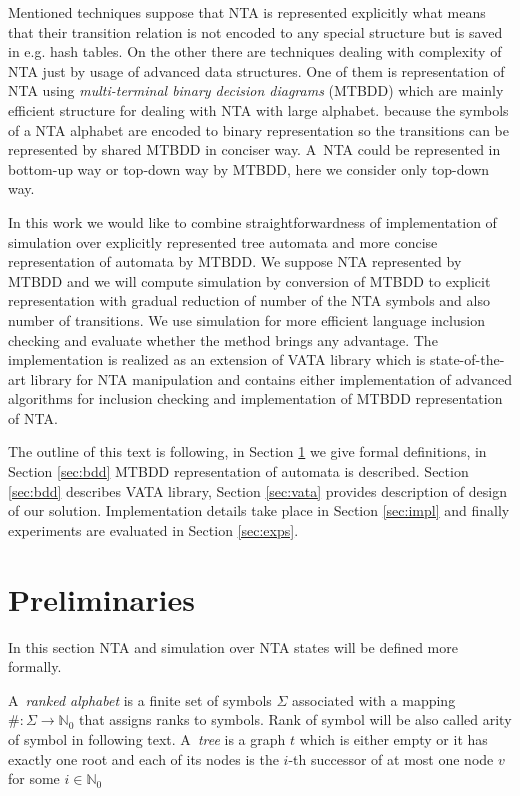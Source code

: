 \documentclass[a4paper, 12pt]{article}
\begin{document}
Mentioned techniques suppose that NTA is represented explicitly what means that their transition relation is not encoded to any special structure but
is saved in e.g. hash tables.
On the other there are techniques dealing with complexity of NTA just by usage of advanced data structures.
One of them is representation of NTA using \textit{multi-terminal binary decision diagrams} (MTBDD) which are mainly efficient structure for dealing with NTA with large alphabet.
because the symbols of a NTA alphabet are encoded to binary representation so the transitions can be represented by shared MTBDD in conciser way.
A~NTA could be represented in bottom-up way or top-down way by MTBDD, here we consider only top-down way.

In this work we would like to combine straightforwardness of implementation of simulation over explicitly
represented tree automata and more concise representation of automata by MTBDD.
We suppose NTA represented by MTBDD and we will compute simulation by conversion of MTBDD
to explicit representation with gradual reduction of number of the NTA symbols and also number of transitions.
We use simulation for more efficient language inclusion checking and evaluate whether the method brings any advantage.
The implementation is realized as an extension of VATA library which is state-of-the-art library for NTA manipulation
and contains either implementation of advanced algorithms for inclusion checking and implementation of MTBDD representation of NTA.

The outline of this text is following, in Section \ref{sec:analysis} we give formal definitions, in Section \ref{sec:bdd} MTBDD representation of automata is described.
Section \ref{sec:bdd} describes VATA library, Section \ref{sec:vata} provides description of design of our solution.
Implementation details take place in Section \ref{sec:impl} and finally experiments are evaluated in Section \ref{sec:exps}.

\section{Preliminaries}
\label{sec:analysis}
In this section NTA and simulation over NTA states will be defined more formally.

A~\emph{ranked alphabet} is a finite set of symbols $\Sigma$ associated with a mapping $\#: \Sigma \rightarrow \mathbb{N}_0$
that assigns ranks to symbols.
Rank of symbol will be also called arity of symbol in following text.
A~\emph{tree} is a graph $t$ which is either empty or it has exactly one root and each of its
nodes is the $i$-th successor of at most one node $v$ for some $i \in \mathbb{N}_0$
\end{document}
